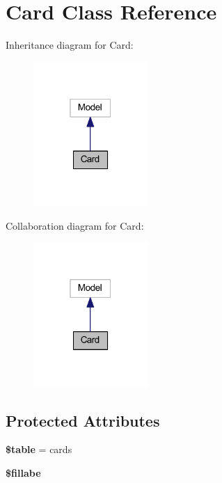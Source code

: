 \hypertarget{class_app_1_1_models_1_1_card}{}\section{Card Class Reference}
\label{class_app_1_1_models_1_1_card}


Inheritance diagram for Card\+:
\nopagebreak
\begin{figure}[H]
\begin{center}
\leavevmode
\includegraphics[width=123pt]{class_app_1_1_models_1_1_card__inherit__graph}
\end{center}
\end{figure}


Collaboration diagram for Card\+:
\nopagebreak
\begin{figure}[H]
\begin{center}
\leavevmode
\includegraphics[width=123pt]{class_app_1_1_models_1_1_card__coll__graph}
\end{center}
\end{figure}
\subsection*{Protected Attributes}
\begin{DoxyCompactItemize}
\item 
\mbox{\label{class_app_1_1_models_1_1_card_ae8876a14058f368335baccf35af4a22b}} 
{\bfseries \$table} = \textquotesingle{}cards\textquotesingle{}
\item 
{\bfseries \$fillabe}
\end{DoxyCompactItemize}


